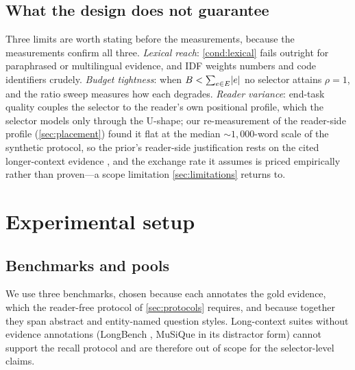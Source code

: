 \documentclass[preprint,12pt]{elsarticle}
\DeclarePairedDelimiter\abs{\lvert}{\rvert}
\theoremstyle{remark}
\begin{document}
\subsection{What the design does not guarantee}
Three limits are worth stating before the measurements, because the
measurements confirm all three. \emph{Lexical reach}:
\autoref{cond:lexical} fails outright for paraphrased or multilingual
evidence, and IDF weights numbers and code identifiers crudely.
\emph{Budget tightness}: when
$B < \sum_{e \in E} \abs{e}$ no selector attains $\rho = 1$, and the
ratio sweep measures how each degrades. \emph{Reader variance}:
end-task quality couples the selector to the reader's own positional
profile, which the selector models only through the U-shape; our
re-measurement of the reader-side profile (\autoref{sec:placement})
found it flat at the median ${\sim}1{,}000$-word scale of the synthetic
protocol, so the prior's reader-side justification rests on the cited
longer-context evidence \citep{liu2023lost}, and the exchange rate it
assumes is priced empirically rather than proven---a scope limitation
\autoref{sec:limitations} returns to.

\section{Experimental setup}
\label{sec:exp}

\subsection{Benchmarks and pools}
\label{sec:pools}
We use three benchmarks, chosen because each annotates the gold
evidence, which the reader-free protocol of \autoref{sec:protocols}
requires, and because together they span abstract and entity-named
question styles. Long-context suites without evidence annotations
(LongBench \citep{bai2023longbench}, MuSiQue \citep{trivedi2022musique}
in its distractor form) cannot support the recall protocol and are
therefore out of scope for the selector-level claims.
\end{document}
